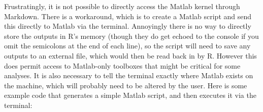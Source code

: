 \documentclass[
]{article}
\newenvironment{Shaded}{\begin{snugshade}}{\end{snugshade}}
\newcommand{\AttributeTok}[1]{\textcolor[rgb]{0.77,0.63,0.00}{#1}}
\newcommand{\CommentTok}[1]{\textcolor[rgb]{0.56,0.35,0.01}{\textit{#1}}}
\newcommand{\FunctionTok}[1]{\textcolor[rgb]{0.00,0.00,0.00}{#1}}
\newcommand{\NormalTok}[1]{#1}
\newcommand{\OtherTok}[1]{\textcolor[rgb]{0.56,0.35,0.01}{#1}}
\newcommand{\SpecialCharTok}[1]{\textcolor[rgb]{0.00,0.00,0.00}{#1}}
\newcommand{\StringTok}[1]{\textcolor[rgb]{0.31,0.60,0.02}{#1}}
\begin{document}
Frustratingly, it is not possible to directly access the Matlab kernel through Markdown. There is a workaround, which is to create a Matlab script and send this directly to Matlab via the terminal. Annoyingly there is no way to directly store the outputs in R's memory (though they do get echoed to the console if you omit the semicolons at the end of each line), so the script will need to save any outputs to an external file, which would then be read back in by R. However this does permit access to Matlab-only toolboxes that might be critical for some analyses. It is also necessary to tell the terminal exactly where Matlab exists on the machine, which will probably need to be altered by the user. Here is some example code that generates a simple Matlab script, and then executes it via the terminal:

\begin{Shaded}
\end{Shaded}
\end{document}
